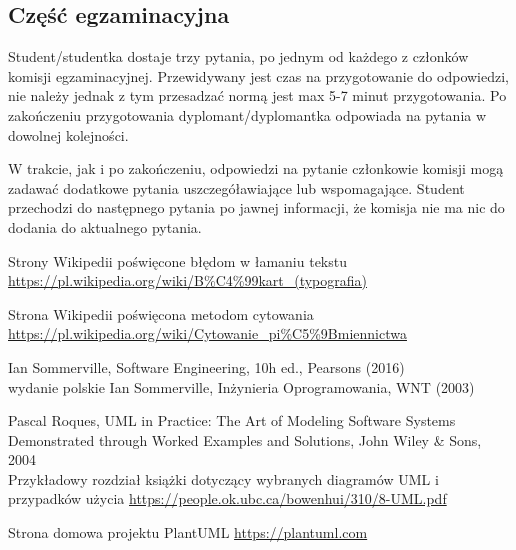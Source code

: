 \documentclass[12pt,a4paper]{article}
\begin{document}
\subsection{Część egzaminacyjna}

Student/studentka dostaje trzy pytania, po jednym od każdego z członków komisji egzaminacyjnej. Przewidywany jest czas na przygotowanie do odpowiedzi, nie należy jednak z tym przesadzać normą jest max 5-7 minut przygotowania. Po zakończeniu przygotowania dyplomant/dyplomantka odpowiada na pytania w dowolnej kolejności.

W trakcie, jak i po zakończeniu, odpowiedzi na pytanie członkowie komisji mogą zadawać dodatkowe pytania uszczegóławiające lub wspomagające. Student przechodzi do następnego pytania po jawnej informacji, że komisja nie ma nic do dodania do aktualnego pytania.




 Strony Wikipedii poświęcone błędom w łamaniu tekstu\\
\url{https://pl.wikipedia.org/wiki/B%C4%99kart_(typografia)}

 Strona Wikipedii poświęcona metodom cytowania \\
\url{https://pl.wikipedia.org/wiki/Cytowanie_pi%C5%9Bmiennictwa}

 Ian Sommerville, Software Engineering, 10h ed., Pearsons  (2016)\\
 wydanie polskie Ian Sommerville, Inżynieria Oprogramowania, WNT (2003)

 Pascal Roques, UML in Practice: The Art of Modeling Software Systems Demonstrated through Worked Examples and Solutions, John Wiley \& Sons, 2004\\
    Przykładowy rozdział książki dotyczący wybranych diagramów UML i przypadków użycia \url{https://people.ok.ubc.ca/bowenhui/310/8-UML.pdf}

 Strona domowa projektu PlantUML \url{https://plantuml.com}
\end{document}
